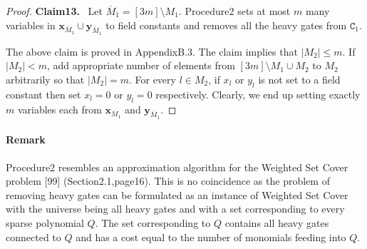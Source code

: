 \documentclass[10pt,a4paper]{article}
\newenvironment{authorclaim}[1]{\par\medskip\noindent\textbf{#1.}\ \ignorespaces}{\par\medskip}
\begin{document}
\begin{proof}
\begin{authorclaim}{Claim13}
Let $\overline M_1=[3m]\setminus M_1$. Procedure2 sets at most $m$ many variables in $\mathbf x_{\overline M_1}\cup\mathbf y_{\overline M_1}$ to field constants and removes all the heavy gates from $\mathtt C_1$.
\end{authorclaim}
The above claim is proved in AppendixB.3. The claim implies that $|M_2|\le m$. If $|M_2|<m$, add appropriate number of elements from $[3m]\setminus M_1\cup M_2$ to $M_2$ arbitrarily so that $|M_2|=m$. For every $l\in M_2$, if $x_l$ or $y_l$ is not set to a field constant then set $x_l=0$ or $y_l=0$ respectively. Clearly, we end up setting exactly $m$ variables each from $\mathbf x_{\overline M_1}$ and $\mathbf y_{\overline M_1}$.
\end{proof}
\paragraph{Remark}
Procedure2 resembles an approximation algorithm for the Weighted Set Cover problem [99] (Section2.1,page16). This is no coincidence as the problem of removing heavy gates can be formulated as an instance of Weighted Set Cover with the universe being all heavy gates and with a set corresponding to every sparse polynomial $Q$. The set corresponding to $Q$ contains all heavy gates connected to $Q$ and has a cost equal to the number of monomials feeding into $Q$.
\end{document}

